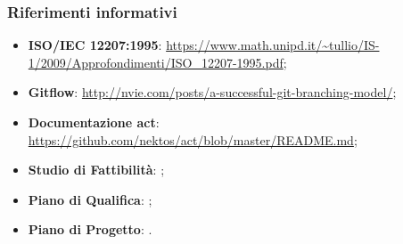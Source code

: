 	\subsubsection{Riferimenti informativi}
	\begin{itemize}
		\item \textbf{ISO/IEC 12207:1995}: \url{https://www.math.unipd.it/~tullio/IS-1/2009/Approfondimenti/ISO_12207-1995.pdf};
		\item \textbf{Gitflow}: \url{http://nvie.com/posts/a-successful-git-branching-model/};
		\item \textbf{Documentazione act}: \url{https://github.com/nektos/act/blob/master/README.md};
		\item \textbf{Studio di Fattibilità}: ;
		\item \textbf{Piano di Qualifica}: ;
		\item \textbf{Piano di Progetto}: .
	\end{itemize}